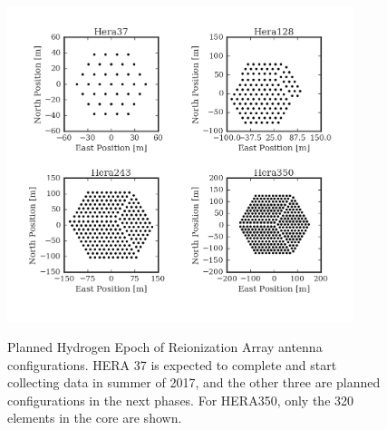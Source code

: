\documentclass[twocolumn,apj,numberedappendix]{emulateapj}
\renewcommand\[{\begin{equation}}
\renewcommand\]{\end{equation}}
\begin{document}
\begin{figure}[h!]
\includegraphics[width=0.9\textwidth]{HeraAntpos}
\label{fig:HeraAntpos}


\caption{Planned Hydrogen Epoch of Reionization Array antenna configurations. HERA 37 is expected to complete and start collecting data in summer of 2017, and the other three are planned configurations in the next phases. For HERA350, only the 320 elements in the core are shown. }
\end{figure}
\end{document}
